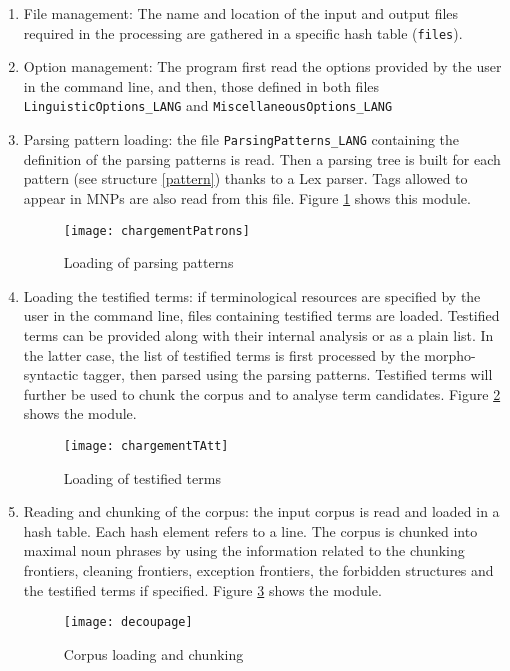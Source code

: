 \begin{enumerate}
\item File management: The name and location of the input and output files required in the
  processing are gathered in a specific hash table (\texttt{files}).

\item Option management: The program first read the options provided
  by the user in the command line, and then, those defined in both
  files \texttt{LinguisticOptions\_LANG} and
  \texttt{MiscellaneousOptions\_LANG}


\item Parsing pattern loading: the file \texttt{ParsingPatterns\_LANG} containing the definition of
  the parsing patterns is read. Then a parsing tree is built for each
  pattern (see structure \ref{pattern}) thanks to a Lex parser. Tags
  allowed to appear in MNPs are also read from this file. Figure
 \ref{ChargePat} shows this module.

\begin{figure}[!htbp]
\begin{center}
\texttt{[image: chargementPatrons]}
\caption{Loading of parsing patterns}\label{ChargePat}
\end{center}
\end{figure}

\item Loading the testified terms: if terminological resources are specified by the user in the
  command line, files containing testified terms are loaded. Testified
  terms can be provided along with their internal analysis or as a
  plain list. In the latter case, the list of testified terms is first 
  processed by the morpho-syntactic tagger, then parsed using the
  parsing patterns. Testified terms will further be used to chunk the
  corpus and to analyse term candidates. Figure \ref{fig:chargeTT} shows the module.

  \begin{figure}[!htbp]
    \begin{center}
    \texttt{[image: chargementTAtt]}
    \caption{Loading of testified terms}
    \label{fig:chargeTT}
\end{center}
  \end{figure}

\item Reading and chunking of the corpus: the input corpus is read and
  loaded in a hash table. Each hash element refers to a line. The
  corpus is chunked into maximal noun phrases by using the information
  related to the chunking frontiers, cleaning frontiers, exception
  frontiers, the forbidden structures %
  and the testified terms if specified. Figure \ref{Decoup} shows the module. 
\begin{figure}[!htbp]
\begin{center}
\texttt{[image: decoupage]}
\caption{Corpus loading and chunking}\label{Decoup}
\end{center}
\end{figure}


\end{enumerate}
